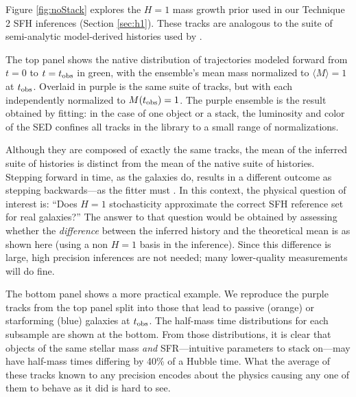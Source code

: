 \documentclass[a4paper,fleqn,usenatbib]{mnras}
\newcommand{\tobs}{t_{\rm obs}}
\begin{document}

Figure \ref{fig:noStack} explores the $H=1$ mass growth prior used in our Technique 2 SFH 
inferences (Section \ref{sec:h1}). These tracks are analogous to the suite of 
semi-analytic model-derived histories used by \citet{Pacifici12}. 

The top panel shows the native distribution of trajectories modeled forward 
from $t=0$ to $t=\tobs$ in green, with the ensemble's mean mass normalized to 
$\langle M\rangle=1$ at $\tobs$. Overlaid in purple is the same suite of tracks, but with
each independently normalized to $M(\tobs)=1$. The purple ensemble is the result obtained
by fitting: in the case of one object or a stack, the luminosity and color of the SED confines 
all tracks in the library to a small range of normalizations. 


Although they are composed of exactly the same tracks, the mean of the inferred suite of histories 
is distinct from the mean of the native suite of histories. Stepping forward in time, as the galaxies do, 
results in a different outcome as stepping backwards---as the fitter must 
\citep[see also][]{Behroozi13a, Torrey17}. In this context, the physical question of interest is: 
``Does $H=1$ stochasticity approximate the correct SFH reference set for real galaxies?'' The 
answer to that question would be obtained by assessing whether the {\it difference} between the 
inferred history and the theoretical mean is as shown here (using a non $H=1$ basis in
the inference). Since this difference is large, high precision inferences are not needed; many 
lower-quality measurements will do fine.

The bottom panel shows a more practical example. We reproduce the purple tracks from the top panel split 
into those that lead to passive (orange) or starforming (blue) galaxies at $\tobs$. 
The half-mass time distributions for each subsample are shown at the bottom. From those distributions, 
it is clear that objects of the same stellar mass {\it and} SFR---intuitive parameters to stack on---may have 
half-mass times differing by 40\% of a Hubble time. What the average of these tracks known to any 
precision encodes about the physics causing any one of them to behave as it did is hard to see.
\end{document}
